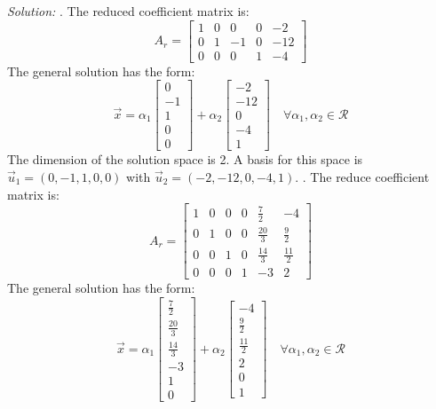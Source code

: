 \documentclass[11pt]{homework}
\begin{document}
\emph{Solution:}
. The reduced coefficient matrix is:
\begin{equation*}
A_r = 
  \begin{bmatrix}
  1 & 0 & 0 & 0 & -2 \\
  0 & 1 & -1 & 0 & -12 \\
  0 & 0 & 0 & 1 & -4 
  \end{bmatrix}
\end{equation*}
The general solution has the form:
\begin{equation}
\vec x = 
  \alpha_1 
  \begin{bmatrix}
    0 \\
    -1 \\
    1 \\
    0\\
    0
  \end{bmatrix}
  +
  \alpha_2
  \begin{bmatrix}
  -2 \\
  -12 \\
  0 \\
  -4 \\
  1
  \end{bmatrix}
  \quad \forall \alpha_1 , \alpha_2 \in \mathcal{R}
\end{equation}
The dimension of the solution space is 2.
A basis for this space is
$\vec u_1 = ( 0 , -1 , 1 , 0, 0)$ with
$\vec u_2 = ( -2 , -12 , 0 , -4 , 1)$.
\newline
{}. The reduce coefficient matrix is:
\begin{equation*}
A_r = 
  \begin{bmatrix}
  1 & 0 & 0 & 0 & \frac{7}{2} & -4 \\
  0 & 1 & 0 & 0 & \frac{20}{3} & \frac{9}{2} \\
  0 & 0 & 1 & 0 & \frac{14}{3} & \frac{11}{2} \\
  0 & 0 & 0 & 1 & -3 & 2
  \end{bmatrix}
\end{equation*}
The general solution has the form:
\begin{equation*}
\vec x =
  \alpha_1 
  \begin{bmatrix}
    \frac{7}{2} \\
    \frac{20}{3} \\
    \frac{14}{3} \\
    -3\\
    1 \\
    0
  \end{bmatrix}
  +
  \alpha_2
  \begin{bmatrix}
  -4 \\
  \frac{9}{2} \\
  \frac{11}{2} \\
  2 \\
  0 \\
  1
  \end{bmatrix}
  \quad \forall \alpha_1 , \alpha_2 \in \mathcal{R}
\end{equation*}
\end{document}
